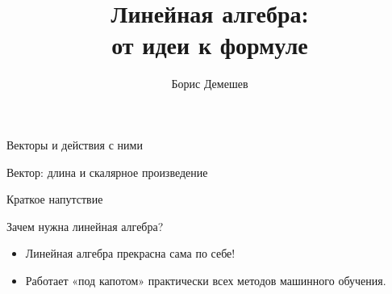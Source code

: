 \documentclass[14pt,xcolor=dvipsnames]{beamer}
\title{Линейная алгебра:\\ от идеи к формуле}
\date{}
\author{Борис Демешев}
\institute{НИУ ВШЭ}
\begin{document}


\begin{frame} %

Векторы и действия с ними

\end{frame}


\begin{frame} %

Вектор: длина и скалярное произведение 
  
\end{frame}
  




\begin{frame}{Краткое напутствие}

\begin{block}{Зачем нужна линейная алгебра?}
\begin{itemize}
  \item Линейная алгебра прекрасна сама по себе!
  \item Работает «под капотом» практически всех методов машинного обучения.
\end{itemize}
\end{block}
\end{frame}
\end{document}
